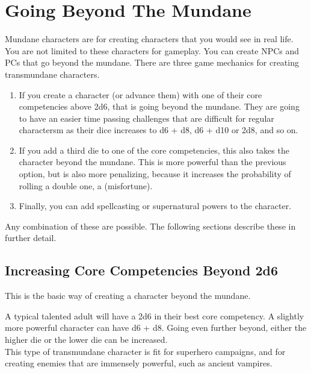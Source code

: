 \documentclass{LegrandOrangeTufteBook}
\newcommand{\term}[1]{\textcolor{colorTerm}{#1}}
\begin{document}
\chapterspaceabove{6.75cm}
\chapterspacebelow{11.25cm}


\chapter*{Going Beyond The Mundane}

\term{Mundane} characters are for creating characters that you would see in real life.
You are not limited to these characters for gameplay.
You can create NPCs and PCs that go beyond the \term{mundane}.
There are three game mechanics for creating \term{transmundane} characters.

\begin{enumerate}
    \item If you create a character (or advance them) with one of their \term{core competencies} above 2d6, that is going beyond the mundane. They are going to have an easier time passing challenges that are difficult for regular charactersm as their dice increases to d6 + d8, d6 + d10 or 2d8, and so on.
    \item If you add a third die to one of the \term{core competencies}, this also takes the character beyond the mundane. This is more powerful than the previous option, but is also more penalizing, because it increases the probability of rolling a double one, a \term(misfortune).
    \item Finally, you can add spellcasting or supernatural powers to the character.
\end{enumerate}

Any combination of these are possible. The following sections describe these in further detail.

\section*{Increasing Core Competencies Beyond 2d6}

This is the basic way of creating a character beyond the \term{mundane}.
\marginpar{
    \footnotesize
    
}

A typical talented adult will have a 2d6 in their best \term{core competency}.
A slightly more powerful character can have d6 + d8.
Going even further beyond, either the higher die or the lower die can be increased.\\

This type of \term{transmundane} character is fit for superhero campaigns,
and for creating enemies that are immensely powerful, such as ancient vampires.
\end{document}
